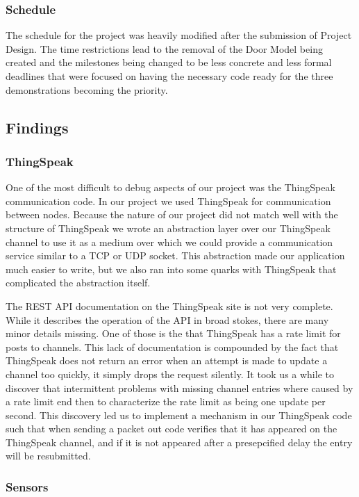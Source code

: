 \subsubsection{Schedule}
The schedule for the project was heavily modified after the submission of Project Design. The time restrictions lead to the removal of the Door Model being created and the milestones being changed to be less concrete and less formal deadlines that were focused on having the necessary code ready for the three demonstrations becoming the priority.

\subsection{Findings}


\subsubsection{ThingSpeak}

One of the most difficult to debug aspects of our project was the ThingSpeak
communication code. In our project we used ThingSpeak for communication between
nodes. Because the nature of our project did not match well with the structure
of ThingSpeak we wrote an abstraction layer over our ThingSpeak channel to
use it as a medium over which we could provide a communication service similar
to a TCP or UDP socket. This abstraction made our application much easier to
write, but we also ran into some quarks with ThingSpeak that complicated the
abstraction itself.

The REST API documentation on the ThingSpeak site is not very complete. While it
describes the operation of the API in broad stokes, there are many minor details
missing. One of those is the that ThingSpeak has a rate limit for posts to
channels. This lack of documentation is compounded by the fact that ThingSpeak
does not return an error when an attempt is made to update a channel too
quickly, it simply drops the request silently. It took us a while to discover
that intermittent problems with missing channel entries where caused by a rate
limit end then to characterize the rate limit as being one update per second.
This discovery led us to implement a mechanism in our ThingSpeak code such that
when sending a packet out code verifies that it has appeared on the ThingSpeak
channel, and if it is not appeared after a presepcified delay the entry will
be resubmitted.

\subsubsection{Sensors}

